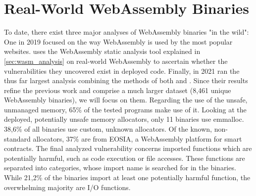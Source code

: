\documentclass[sigconf]{acmart}
\begin{document}
\section{Real-World WebAssembly Binaries}
To date, there exist three major analyses of WebAssembly binaries "in the wild": One in 2019 \cite{musch_new_2019} focused on the way WebAssembly is used by the most popular websites. \cite{lehmann_everything_2020} uses the WebAssembly static analysis tool explained in \ref{sec:wasm_analysis} on real-world WebAssembly to ascertain whether the vulnerabilities they uncovered exist in deployed code. Finally, in 2021 \cite{hilbig_empirical_2021} ran the thus far largest analysis combining the methods of both \cite{musch_new_2019} and \cite{lehmann_everything_2020}. Since their results refine the previous work and comprise a much larger dataset (8,461 unique WebAssembly binaries), we will focus on them. Regarding the use of the unsafe, unmanaged memory, 65\% of the tested programs make use of it. Looking at the deployed, potentially unsafe memory allocators, only 11 binaries use emmalloc. 38,6\% of all binaries use custom, unknown allocators. Of the known, non-standard allocators, 37\% are from EOSIA, a WebAssembly platform for smart contracts. The final analyzed vulnerability concerns imported functions which are potentially harmful, such as code execution or file accesses. These functions are separated into categories, whose import name is searched for in the binaries. While 21,2\% of the binaries import at least one potentially harmful function, the overwhelming majority are I/O functions.





\appendix
\end{document}
